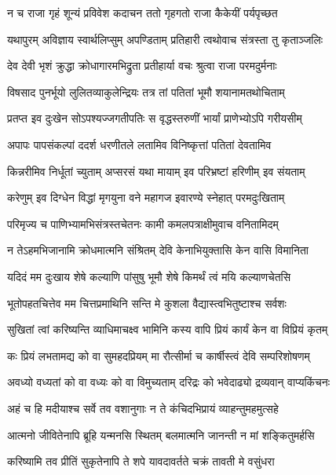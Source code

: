 \twolineshloka
{न च राजा गृहं शून्यं प्रविवेश कदाचन}
{ततो गृहगतो राजा कैकेयीं पर्यपृच्छत} %

\twolineshloka
{यथापुरम् अविज्ञाय स्वार्थलिप्सुम् अपण्डिताम्}
{प्रतिहारी त्वथोवाच संत्रस्ता तु कृताञ्जलिः} %

\twolineshloka
{देव देवी भृशं क्रुद्धा क्रोधागारमभिद्रुता}
{प्रतीहार्या वचः श्रुत्वा राजा परमदुर्मनाः} %

\twolineshloka
{विषसाद पुनर्भूयो लुलितव्याकुलेन्द्रियः}
{तत्र तां पतितां भूमौ शयानामतथोचिताम्} %

\twolineshloka
{प्रतप्त इव दुःखेन सोऽपश्यज्जगतीपतिः}
{स वृद्धस्तरुणीं भार्यां प्राणेभ्योऽपि गरीयसीम्} %

\twolineshloka
{अपापः पापसंकल्पां ददर्श धरणीतले}
{लतामिव विनिष्कृत्तां पतितां देवतामिव} %

\twolineshloka
{किन्नरीमिव निर्धूतां च्युताम् अप्सरसं यथा}
{मायाम् इव परिभ्रष्टां हरिणीम् इव संयताम्} %

\twolineshloka
{करेणुम् इव दिग्धेन विद्धां मृगयुना वने}
{महागज इवारण्ये स्नेहात् परमदुःखिताम्} %

\twolineshloka
{परिमृज्य च पाणिभ्यामभिसंत्रस्तचेतनः}
{कामी कमलपत्राक्षीमुवाच वनितामिदम्} %

\twolineshloka
{न तेऽहमभिजानामि क्रोधमात्मनि संश्रितम्}
{देवि केनाभियुक्तासि केन वासि विमानिता} %

\twolineshloka
{यदिदं मम दुःखाय शेषे कल्याणि पांसुषु}
{भूमौ शेषे किमर्थं त्वं मयि कल्याणचेतसि} %

\twolineshloka
{भूतोपहतचित्तेव मम चित्तप्रमाथिनि}
{सन्ति मे कुशला वैद्यास्त्वभितुष्टाश्च सर्वशः} %

\twolineshloka
{सुखितां त्वां करिष्यन्ति व्याधिमाचक्ष्व भामिनि}
{कस्य वापि प्रियं कार्यं केन वा विप्रियं कृतम्} %

\twolineshloka
{कः प्रियं लभतामद्य को वा सुमहदप्रियम्}
{मा रौत्सीर्मा च कार्षीस्त्वं देवि सम्परिशोषणम्} %

\twolineshloka
{अवध्यो वध्यतां को वा वध्यः को वा विमुच्यताम्}
{दरिद्रः को भवेदाढ्यो द्रव्यवान् वाप्यकिंचनः} %

\twolineshloka
{अहं च हि मदीयाश्च सर्वे तव वशानुगाः}
{न ते कंचिदभिप्रायं व्याहन्तुमहमुत्सहे} %

\twolineshloka
{आत्मनो जीवितेनापि ब्रूहि यन्मनसि स्थितम्}
{बलमात्मनि जानन्ती न मां शङ्कितुमर्हसि} %

\twolineshloka
{करिष्यामि तव प्रीतिं सुकृतेनापि ते शपे}
{यावदावर्तते चक्रं तावती मे वसुंधरा} %

